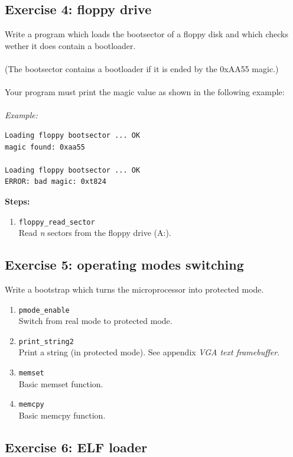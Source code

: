 \subsection*{Exercise 4: floppy drive}

Write a program which loads the bootsector of a floppy disk and which checks wether it does contain a bootloader.\\
\\
(The bootsector contains a bootloader if it is ended by the 0xAA55 magic.)\\
\\
Your program must print the magic value as shown in the following example:\\
\\
{\em Example:}
\begin{verbatim}
Loading floppy bootsector ... OK
magic found: 0xaa55

Loading floppy bootsector ... OK
ERROR: bad magic: 0xt824
\end{verbatim}
{\bf Steps:}
  \begin{enumerate}
  \item {\tt floppy\_read\_sector}\\
  Read {\em n} sectors from the floppy drive (A:).
  \end{enumerate}

\subsection*{Exercise 5: operating modes switching}

Write a bootstrap which turns the microprocessor into protected mode.

  \begin{enumerate}
  \item {\tt pmode\_enable}\\
  Switch from real mode to protected mode.
  \item {\tt print\_string2}\\
  Print a string (in protected mode). See appendix \emph{VGA text
  framebuffer}.
  \item {\tt memset}\\
  Basic memset function.
  \item {\tt memcpy}\\
  Basic memcpy function.
  \end{enumerate}

\subsection*{Exercise 6: ELF loader}

